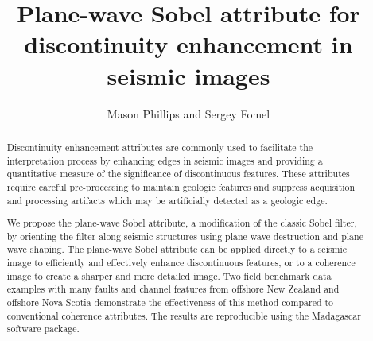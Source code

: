 
\title{Plane-wave Sobel attribute for discontinuity enhancement in seismic images}
\author{Mason Phillips and Sergey Fomel}
\address{The University of Texas at Austin,\\
John A. and Katherine G. Jackson School of Geosciences,\\ Bureau of Economic Geology,\\
Austin, Texas, USA}



\maketitle
\begin{abstract}
Discontinuity enhancement attributes are commonly used to facilitate the interpretation process by enhancing edges in seismic images and providing a quantitative measure of the significance of discontinuous features. 
These attributes require careful pre-processing to maintain geologic features and suppress acquisition and processing artifacts which may be artificially detected as a geologic edge. 

We propose the plane-wave Sobel attribute, a modification of the classic Sobel filter, by orienting the filter along seismic structures using plane-wave destruction and plane-wave shaping. 
The plane-wave Sobel attribute can be applied directly to a seismic image to efficiently and effectively enhance discontinuous features, or to a coherence image to create a sharper and more detailed image.
Two field benchmark data examples with many faults and channel features from offshore New Zealand and offshore Nova Scotia demonstrate the effectiveness of this method compared to conventional coherence attributes.
The results are reproducible using the Madagascar software package.

\end{abstract}

